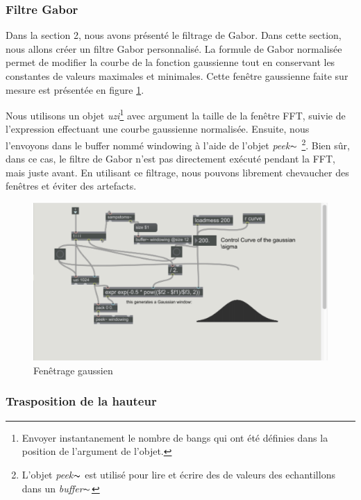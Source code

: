 \subsubsection{Filtre Gabor}

Dans la section 2, nous avons présenté le filtrage de Gabor. Dans cette section, nous allons créer un filtre Gabor personnalisé. La formule de Gabor normalisée permet de modifier la courbe de la fonction gaussienne tout en conservant les constantes de valeurs maximales et minimales. Cette fenêtre gaussienne faite sur mesure est présentée en figure \ref{windowing}.

Nous utilisons un objet \textit{uzi}\footnote{Envoyer instantanement le nombre de \guillemotleft bangs \guillemotright qui ont été définies dans la position de l'argument de l'objet.} avec argument la taille de la fenêtre FFT, suivie de l'expression effectuant une courbe gaussienne normalisée. Ensuite, nous l'envoyons dans le buffer nommé \guillemotleft windowing \guillemotright à l'aide de l'objet \textit{peek}$ \thicksim $ \footnote{L'objet \textit{peek}$ \thicksim $ est utilisé pour lire et écrire des de valeurs des echantillons dans un \textit{buffer}$ \thicksim $ }. Bien sûr, dans ce cas, le filtre de Gabor n’est pas directement exécuté pendant la FFT, mais juste avant. En utilisant ce filtrage, nous pouvons librement chevaucher des fenêtres et éviter des artefacts.
    
    \begin{figure}
        \centering
        \includegraphics[width = \textwidth]{Graphs/windowing.png}
        \caption{Fenêtrage gaussien}
        \label{windowing}
    \end{figure}

\subsubsection{Trasposition de la hauteur}

